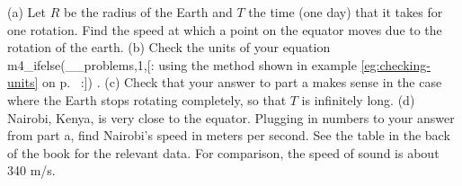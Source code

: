 (a) Let $R$ be the radius of the Earth and $T$ the time (one day) that it takes for one rotation. Find the
speed at which a point on the equator moves due to the rotation of the earth.\answercheck\hwendpart
(b) Check the units of your equation 
m4_ifelse(__problems,1,[:%
using the method shown in example \ref{eg:checking-units}
on p.~\pageref{eg:checking-units}%
:])%
.\hwendpart
(c) Check that your answer to part a makes sense in the case where the Earth stops rotating completely,
so that $T$ is infinitely long.\hwendpart
(d) Nairobi, Kenya, is very close to the equator. Plugging in numbers to your answer from part a,
find Nairobi's speed in meters per second. See the table in
the back of the book for the relevant data. For comparison, the speed of sound
is about 340 m/s.\answercheck\hwendpart
